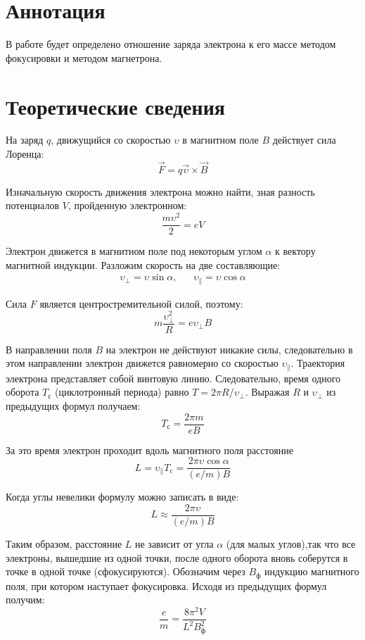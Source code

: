  


\section{Аннотация}
В работе будет определено отношение заряда электрона к его массе методом фокусировки и
методом магнетрона.
\section{Теоретические сведения}
На заряд $q$, движущийся со скоростью $\upsilon$ в магнитном поле $B$ действует сила Лоренца:
\[
\vec F = q\vec \upsilon \times\vec B
\] 

Изначальную скорость движения электрона можно найти, зная разность потенциалов $V$, пройденную
электронном:
\[
\frac{m\upsilon^2}{2} = eV
\] 

Электрон движется в магнитном поле под некоторым углом $\alpha$ к вектору магнитной индукции.
Разложим скорость на две составляющие:
\begin{equation*}
    \begin{aligned}
        \upsilon_\bot= \upsilon \sin\alpha, & & \upsilon_\| = \upsilon \cos \alpha
    \end{aligned}
\end{equation*}

Сила $F$ является центростремительной силой, поэтому:
\[
m\frac{\upsilon_\bot^2}{R} = e\upsilon_\bot B
\] 

В направлении поля $B$ на электрон не действуют никакие силы, следовательно в этом направлении
электрон движется равномерно со скоростью $\upsilon_\|$. Траектория электрона представляет
собой винтовую линию. Следовательно, время одного оборота $T_\text{с}$ (циклотронный периода) равно
$T = 2\pi R/\upsilon_\bot$. Выражая $R$ и $\upsilon_\bot$ из предыдущих формул получаем:
\[
    T_\text{с} = \frac{2\pi m}{eB}
\] 

За это время электрон проходит вдоль магнитного поля расстояние
\[
L = \upsilon_\| T_\text{c} = \frac{2\pi \upsilon \cos \alpha}{(e/m) B}
\] 

Когда углы невелики формулу можно записать в виде:
\[
    L \approx \frac{2\pi \upsilon}{(e/m)B}
\] 

Таким образом, расстояние $L$ не зависит от угла $\alpha$ (для малых углов),так что все электроны,
вышедшие из одной точки, после одного оборота вновь соберутся в точке в одной точке
(сфокусируются). Обозначим через $B_\text{ф}$ индукцию магнитного поля, при котором наступает
фокусировка. Исходя из предыдущих формул получим:
\begin{equation}
    \frac{e}{m} = \frac{8\pi^2V}{L^2B_\text{ф}^2}  
\end{equation}

